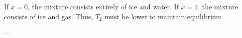 If \( x = 0 \), the mixture consists entirely of ice and water.  
If \( x = 1 \), the mixture consists of ice and gas.  
Thus, \( T_2 \) must be lower to maintain equilibrium.

---